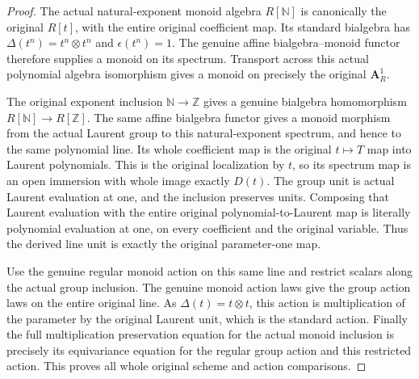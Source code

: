 \begin{proof}
The actual natural-exponent monoid algebra $R[\mathbb N]$
is canonically the original $R[t]$, with the entire original
coefficient map. Its standard bialgebra has
$\Delta(t^n)=t^n\otimes t^n$ and $\epsilon(t^n)=1$.
The genuine affine bialgebra--monoid functor therefore supplies
a monoid on its spectrum. Transport across this actual
polynomial algebra isomorphism gives a monoid on precisely
the original $\mathbf A^1_R$.

The original exponent inclusion $\mathbb N\to\mathbb Z$
gives a genuine bialgebra homomorphism
$R[\mathbb N]\to R[\mathbb Z]$.
The same affine bialgebra functor gives a monoid morphism
from the actual Laurent group to this natural-exponent
spectrum, and hence to the same polynomial line.
Its whole coefficient map is the original $t\mapsto T$ map
into Laurent polynomials. This is the original localization
by $t$, so its spectrum map is an open immersion with whole
image exactly $D(t)$.
The group unit is actual Laurent evaluation at one, and the
inclusion preserves units. Composing that Laurent evaluation
with the entire original polynomial-to-Laurent map is
literally polynomial evaluation at one, on every coefficient
and the original variable. Thus the derived line unit is
exactly the original parameter-one map.

Use the genuine regular monoid action on this same line and
restrict scalars along the actual group inclusion. The genuine
monoid action laws give the group action laws on the entire
original line. As $\Delta(t)=t\otimes t$, this action is
multiplication of the parameter by the original Laurent unit,
which is the standard action. Finally the full multiplication
preservation equation for the actual monoid inclusion is
precisely its equivariance equation for the regular group
action and this restricted action. This proves all whole
original scheme and action comparisons.
\end{proof}
